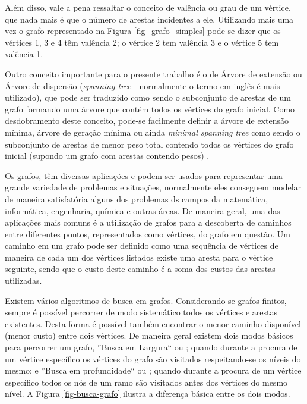 Além disso, vale a pena ressaltar o conceito de valência ou grau de um vértice, que nada mais é que o número de arestas incidentes a ele. Utilizando mais uma vez o grafo representado na Figura \ref{fig_grafo_simples} pode-se dizer que os vértices 1, 3 e 4 têm valência 2; o vértice 2 tem valência 3 e o vértice 5 tem valência 1.

Outro conceito importante para o presente trabalho é o de Árvore de extensão ou Árvore de dispersão (\emph{spanning tree} - normalmente o termo em inglês é mais utilizado), que pode ser traduzido como sendo o subconjunto de arestas de um grafo formando uma árvore que contém todos os vértices do grafo inicial. Como desdobramento deste conceito, pode-se facilmente definir a árvore de extensão mínima, árvore de geração mínima ou ainda \emph{minimal spanning tree} como sendo o subconjunto de arestas de menor peso total contendo todos os vértices do grafo inicial (supondo um grafo com arestas contendo pesos) \cite{Eppstein1996}.

Os grafos, têm diversas aplicações e podem ser usados para representar uma grande variedade de problemas e situações, normalmente eles conseguem modelar de maneira satisfatória alguns dos problemas ds campos da matemática, informática, engenharia, química e outras áreas. De maneira geral, uma das aplicações mais comuns é a utilização de grafos para a descoberta de caminhos entre diferentes pontos, representados como vértices, do grafo em questão. Um caminho em um grafo pode ser definido como uma sequência de vértices de maneira de cada um dos vértices listados existe uma aresta para o vértice seguinte, sendo que o custo deste caminho é a soma dos custos das arestas utilizadas.

Existem vários algoritmos de busca em grafos. Considerando-se grafos finitos, sempre é possível percorrer de modo sistemático todos os vértices e arestas existentes. Desta forma é possível também encontrar o menor caminho disponível (menor custo) entre dois vértices. De maneira geral existem dois modos básicos para percorrer um grafo, ''Busca em Largura`` ou ; quando durante a procura de um vértice específico os vértices do grafo são visitados respeitando-se os níveis do mesmo;  e ''Busca em profundidade`` ou ; quando durante a procura de um vértice específico todos os nós de um ramo são visitados antes dos vértices do mesmo nível. A Figura \ref{fig-busca-grafo} ilustra a diferença básica entre os dois modos.

